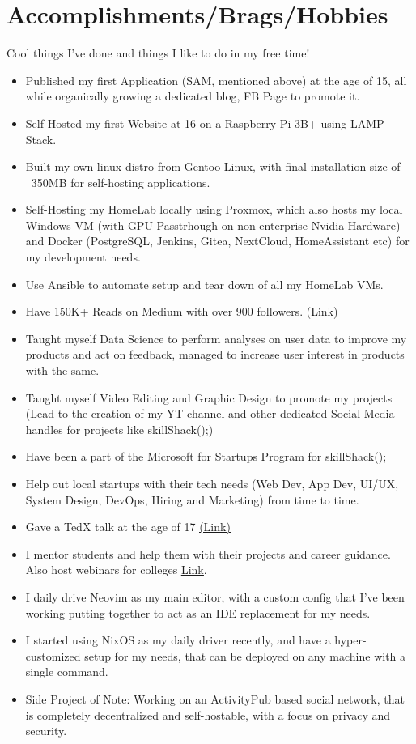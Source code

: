 \documentclass[a4paper,11pt]{article}
\newcommand{\resumeItem}[1]{
  \item\large{#1}
}
\newcommand{\resumeItemListStart}{\begin{itemize}[rightmargin=0.11in]}
\newcommand{\resumeItemListEnd}{\end{itemize}}
\begin{document}

\section{\LARGE{Accomplishments/Brags/Hobbies}}
\large{Cool things I've done and things I like to do in my free time!}
\resumeItemListStart{}
	\resumeItem{Published my first Application (SAM, mentioned above) at the age of 15, all while organically growing a dedicated blog, FB Page to promote it.}
\resumeItem{Self-Hosted my first Website at 16 on a Raspberry Pi 3B+ using LAMP Stack.}
\resumeItem{Built my own linux distro from Gentoo Linux, with final installation size of ~350MB for self-hosting applications.}
\resumeItem{Self-Hosting my HomeLab locally using Proxmox, which also hosts my local Windows VM (with GPU Passtrhough on non-enterprise Nvidia Hardware) and Docker (PostgreSQL, Jenkins, Gitea, NextCloud, HomeAssistant etc) for my development needs.}
\resumeItem{Use Ansible to automate setup and tear down of all my HomeLab VMs.}
\resumeItem{Have 150K+ Reads on Medium with over 900 followers. \href{https://medium.com/@sushrit.pk21}{\uline{(Link)}}}
\resumeItem{Taught myself Data Science to perform analyses on user data to improve my products and act on feedback, managed to increase user interest in products with the same.}
\resumeItem{Taught myself Video Editing and Graphic Design to promote my projects (Lead to the creation of my YT channel and other dedicated Social Media handles for projects like skillShack();)}
\resumeItem{Have been a part of the Microsoft for Startups Program for skillShack();}
\resumeItem{Help out local startups with their tech needs (Web Dev, App Dev, UI/UX, System Design, DevOps, Hiring and Marketing) from time to time.}
\resumeItem{Gave a TedX talk at the age of 17 \href{https://www.youtube.com/watch?v=0XXque5QdHg}{\uline{(Link)}}}
\resumeItem{I mentor students and help them with their projects and career guidance. Also host webinars for colleges \href{https://www.youtube.com/watch?v=l673uNfDLX8}{\uline{Link}}.}
\resumeItem{I daily drive Neovim as my main editor, with a custom config that I've been working putting together to act as an IDE replacement for my needs.}
\resumeItem{I started using NixOS as my daily driver recently, and have a hyper-customized setup for my needs, that can be deployed on any machine with a single command.}
\resumeItem{Side Project of Note: Working on an ActivityPub based social network, that is completely decentralized and self-hostable, with a focus on privacy and security.}
\resumeItemListEnd{}

\end{document}
